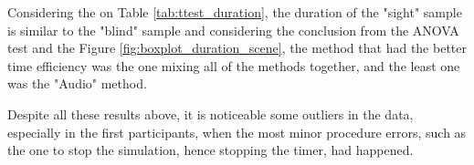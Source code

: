

Considering the on Table \ref{tab:ttest_duration}, the duration of the "sight" sample is similar to the "blind" sample and considering the conclusion from the ANOVA test and the Figure \ref{fig:boxplot_duration_scene}, the method that had the better time efficiency was the one mixing all of the methods together, and the least one was the "Audio" method.

Despite all these results above, it is noticeable some outliers in the data, especially in the first participants, when the most minor procedure errors, such as the one to stop the simulation, hence stopping the timer, had happened.


\FloatBarrier